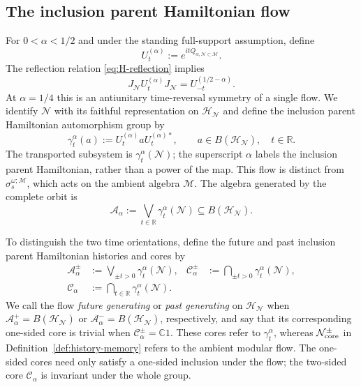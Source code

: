 \documentclass[a4paper,11pt]{article}
\theoremstyle{definition}
\newcommand{\nn}{\nonumber}
\newcommand{\mN}{\mathcal{N}}
\newcommand{\mH}{\mathcal{H}}
\newcommand{\mM}{\mathcal{M}}
\begin{document}
\subsection{The inclusion parent Hamiltonian flow}

For $0<\alpha<1/2$ and under the standing full-support assumption, define
\begin{equation}
    U_t^{(\alpha)}:=e^{itQ_{\alpha,\mN\subset\mM}}.
\end{equation}
The reflection relation \eqref{eq:H-reflection} implies
\begin{equation}
    J_{\mN}U_t^{(\alpha)}J_{\mN}=U_{-t}^{(1/2-\alpha)}.
    \label{eq:H-quarter-time-reversal}
\end{equation}
At $\alpha=1/4$ this is an antiunitary time-reversal symmetry of a single flow. We identify $\mN$ with its faithful representation on
$\mH_{\mN}$ and define the inclusion parent Hamiltonian automorphism group by
\begin{equation}
    \gamma_t^\alpha(a)
    :=U_t^{(\alpha)}aU_t^{(\alpha)*},
    \qquad a\in B(\mH_{\mN}),\quad t\in\mathbb R.
    \label{eq:N-alpha-t-general}
\end{equation}
The transported subsystem is $\gamma_t^\alpha(\mN)$; the superscript
$\alpha$ labels the inclusion parent Hamiltonian, rather than a power of the map.
This flow is distinct from $\sigma_s^{\omega;\mM}$, which acts on the
ambient algebra $\mM$.
The algebra generated by the complete orbit is
\begin{equation}
    \mathcal A_\alpha
    :=
    \bigvee_{t\in\mathbb R}
    \gamma_t^\alpha(\mN)
    \subseteq B(\mH_{\mN}).
    \label{eq:A-alpha-general}
\end{equation}

To distinguish the two time orientations, define the future and past
inclusion parent Hamiltonian histories and cores by
\begin{align}
    \mathcal A_\alpha^\pm
    &:=\bigvee_{\pm t>0}\gamma_t^\alpha(\mN),
    &
    \mathcal C_\alpha^\pm
    &:=\bigcap_{\pm t>0}\gamma_t^\alpha(\mN),\nn\\
    \mathcal C_\alpha
    &:=\bigcap_{t\in\mathbb R}\gamma_t^\alpha(\mN).
    \label{eq:Halpha-one-sided-histories-cores}
\end{align}
We call the flow \emph{future generating} or \emph{past generating} on
$\mH_{\mN}$ when $\mathcal A_\alpha^+=B(\mH_{\mN})$ or
$\mathcal A_\alpha^-=B(\mH_{\mN})$, respectively, and say that its
corresponding one-sided core is trivial when
$\mathcal C_\alpha^\pm=\mathbb C1$. These cores refer to
$\gamma_t^\alpha$, whereas $\mN_{\rm core}^{\pm}$ in
Definition~\ref{def:history-memory} refers to the ambient modular flow.
The one-sided cores need only satisfy a one-sided inclusion under the
flow; the two-sided core $\mathcal C_\alpha$ is invariant under the
whole group.
\end{document}
